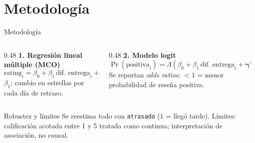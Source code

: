 \documentclass[11pt, aspectratio=169, table]{beamer}
\begin{document}
\section{Metodología}
\begin{frame}{Metodología}
    \begin{columns}[T]
        \begin{column}{0.48\textwidth}
            \textbf{1. Regresión lineal múltiple (MCO)}
            \[
                \text{rating}_i = \beta_0 + \beta_1\,\text{dif. entrega}_i + \mathbf{\gamma}'\mathbf{X}_i + \varepsilon_i
            \]
            $\beta_1$: cambio en estrellas por cada día de retraso.
        \end{column}
        \begin{column}{0.48\textwidth}
            \textbf{2. Modelo logit}
            \[
                \Pr(\text{positiva}_i) = \Lambda\!\left(\beta_0 + \beta_1\,\text{dif. entrega}_i + \mathbf{\gamma}'\mathbf{X}_i\right)
            \]
            Se reportan \textit{odds ratios}: $<1$ = menor probabilidad de reseña positiva.
        \end{column}
    \end{columns}

    \vspace{0.5em}
    \begin{block}{Robustez y límites}
        Se reestima todo con \texttt{atrasado} (1 = llegó tarde). Límites: calificación acotada entre 1 y 5 tratada como continua; interpretación de asociación, no causal.
    \end{block}
\end{frame}

\end{document}
